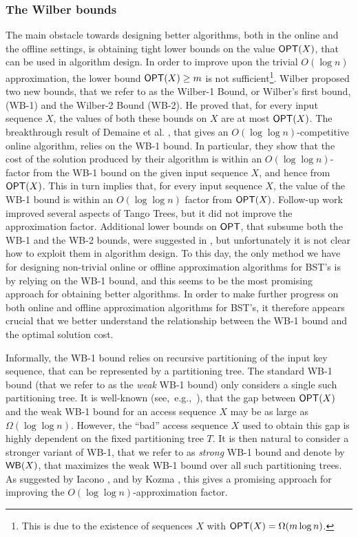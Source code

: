 \documentclass[11pt]{article}
\numberwithin{equation}{section}
\theoremstyle{definition}
\theoremstyle{plain}
\begin{document}
\subsubsection{The Wilber bounds} 

The main obstacle towards designing better algorithms, both in the online and the offline settings, is  obtaining tight lower bounds on the value $\mbox{\sf OPT}(X)$, that can be used in algorithm design. 
%
%
%
In order to improve upon the trivial $O(\log n)$ approximation, the lower bound $\mbox{\sf OPT}(X) \geq m$ is not sufficient\footnote{This is due to the existence of sequences $X$ with $\mbox{\sf OPT}(X) = \Omega(m \log n)$.}. 
Wilber \cite{wilber} proposed two new bounds, that we refer to as the  Wilber-1 Bound, or Wilber's first bound, (WB-1) and the Wilber-2
Bound (WB-2). 
He proved that, for every input sequence $X$, the values of both these bounds on $X$ are at most $\mbox{\sf OPT}(X)$. %
%
The breakthrough result of 
%
Demaine et al. \cite{tango}, that gives
an $O(\log\log n)$-competitive online algorithm, relies on the WB-1 bound. In particular, they show that the cost of the solution produced by their algorithm is within an $O(\log\log n)$-factor from the
WB-1 bound on the given input sequence $X$, and hence from $\mbox{\sf OPT}(X)$. This in turn implies that, for every input sequence $X$, the value of the WB-1 bound is within an $O(\log\log n)$ factor from $\mbox{\sf OPT}(X)$. Follow-up work \cite{multisplay,chain_splay} improved several
aspects of Tango Trees, but it did not improve the approximation factor. Additional lower bounds on $\mbox{\sf OPT}$, that subsume both the WB-1 and the WB-2 bounds, were suggested in \cite{DHIKP09,DSW,Harmon}, but unfortunately it is not clear how to exploit them in algorithm design. %
To this day, the only method we have for designing non-trivial online or offline approximation algorithms for BST's is by relying on the WB-1 bound, and this seems to be the most promising approach for obtaining better algorithms.
In order to make further progress on both online and offline approximation algorithms for BST's, it therefore appears crucial that we better understand the relationship between the WB-1 bound and the optimal solution cost. 

Informally, the WB-1 bound relies on recursive partitioning of the input key sequence, that  can be represented by a partitioning tree. The standard WB-1 bound (that we refer to as the \emph{weak} WB-1 bound)  only considers a single such partitioning tree. It is well-known (see,~e.g.,~\cite{tango,multisplay,in_pursuit}), that the gap between $\mbox{\sf OPT}(X)$
and the weak WB-1 bound for an access sequence $X$ may be as large as  $\Omega(\log\log n)$.  
However, the ``bad'' access sequence $X$ used to obtain this gap is highly dependent on the fixed partitioning tree $T$. It is then natural to consider a stronger variant of WB-1, that we refer to as \emph{strong} WB-1 bound and denote by $\mathsf{WB}(X)$, that maximizes the weak WB-1 bound over all such partitioning trees.
As suggested by  Iacono \cite{in_pursuit}, and by Kozma \cite{Kozma16_thesis}, this gives a promising approach for improving the $O(\log\log n)$-approximation factor. 
\end{document}
